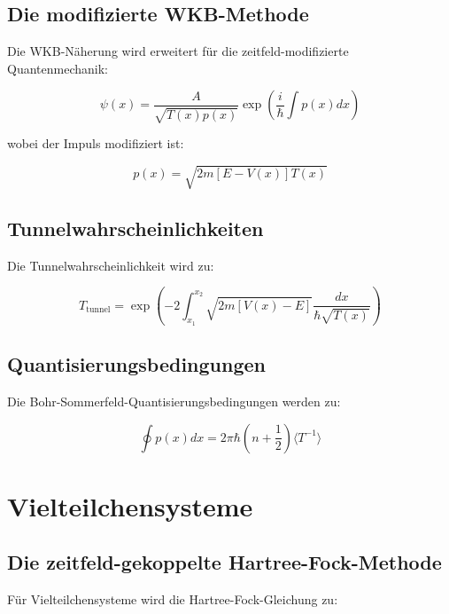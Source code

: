 \documentclass[12pt,a4paper]{report}
\begin{document}
	\subsection{Die modifizierte WKB-Methode}
	
	Die WKB-Näherung wird erweitert für die zeitfeld-modifizierte Quantenmechanik:
	
	\begin{equation}
		\psi(x) = \frac{A}{\sqrt{T(x)p(x)}} \exp\left(\frac{i}{\hbar}\int p(x) dx\right)
	\end{equation}
	
	wobei der Impuls modifiziert ist:
	
	\begin{equation}
		p(x) = \sqrt{2m[E - V(x)]T(x)}
	\end{equation}
	
	\subsection{Tunnelwahrscheinlichkeiten}
	
	Die Tunnelwahrscheinlichkeit wird zu:
	
	\begin{equation}
		T_{\text{tunnel}} = \exp\left(-2\int_{x_1}^{x_2} \sqrt{2m[V(x) - E]} \frac{dx}{\hbar\sqrt{T(x)}}\right)
	\end{equation}
	
	\subsection{Quantisierungsbedingungen}
	
	Die Bohr-Sommerfeld-Quantisierungsbedingungen werden zu:
	
	\begin{equation}
		\oint p(x) dx = 2\pi\hbar\left(n + \frac{1}{2}\right)\langle T^{-1}\rangle
	\end{equation}
	
	\section{Vielteilchensysteme}
	
	\subsection{Die zeitfeld-gekoppelte Hartree-Fock-Methode}
	
	Für Vielteilchensysteme wird die Hartree-Fock-Gleichung zu:
	
\end{document}
